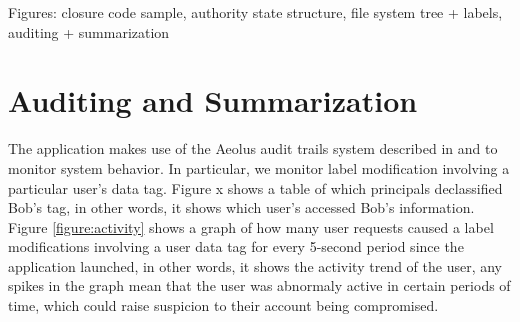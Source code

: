 Figures: closure code sample, authority state structure, file system tree + labels, auditing + summarization

\section{Auditing and Summarization}

The application makes use of the Aeolus audit trails system described in \cite{popic} and \cite{blanks} to monitor system behavior. In particular, we monitor label modification involving a particular user's data tag. Figure x shows a table of which principals declassified Bob's tag, in other words, it shows which user's accessed Bob's information. Figure \ref{figure:activity} shows a graph of how many user requests caused a label modifications involving a user data tag for every 5-second period since the application launched, in other words, it shows the activity trend of the user, any spikes in the graph mean that the user was abnormaly active in certain periods of time, which could raise suspicion to their account being compromised.


